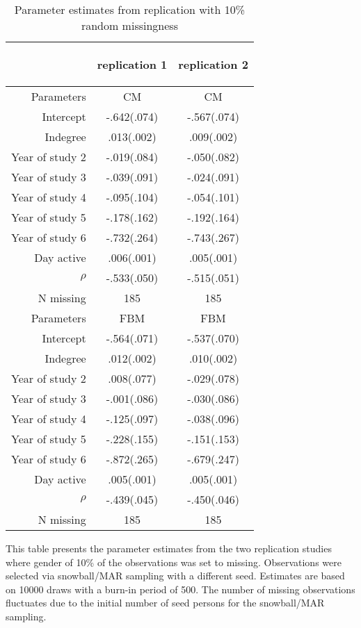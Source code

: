 \documentclass{article}
\begin{document}
\begin{table}[ht]
	\centering
	\caption{Parameter estimates from replication with 10\% random missingness}
	\label{tab:replication_random}
        \bigskip
		\bigskip
		\bigskip
		\begin{tabular}{r|cc}
			&
			\begin{rotate}{60} replication 1 \end{rotate} &
			\begin{rotate}{60} replication 2 \end{rotate} \\ \hline
			Parameters	   & CM      	& CM        \\ \hline
			Intercept 	   &-.642(.074)	&-.567(.074) \\
			Indegree	   & .013(.002)	& .009(.002) \\
			Year of study 2&-.019(.084)	&-.050(.082) \\
			Year of study 3&-.039(.091)	&-.024(.091) \\
			Year of study 4&-.095(.104)	&-.054(.101) \\
			Year of study 5&-.178(.162)	&-.192(.164) \\
			Year of study 6&-.732(.264)	&-.743(.267) \\
			Day active 	   & .006(.001)	& .005(.001) \\
			$\rho$ 		   &-.533(.050)	&-.515(.051) \\
			N missing      & 185        & 185        \\ \hline
			
			Parameters	   & FBM     	& FBM    	 \\ \hline
			Intercept 	   &-.564(.071) &-.537(.070) \\
			Indegree       & .012(.002) & .010(.002) \\
			Year of study 2& .008(.077) &-.029(.078) \\
			Year of study 3&-.001(.086) &-.030(.086) \\
			Year of study 4&-.125(.097) &-.038(.096) \\
			Year of study 5&-.228(.155) &-.151(.153) \\
			Year of study 6&-.872(.265) &-.679(.247) \\		
			Day active 	   & .005(.001) & .005(.001) \\
			$\rho$ 		   &-.439(.045) &-.450(.046) \\
			N missing      & 185        & 185        \\ \hline
		\end{tabular}
	
	\raggedright This table presents the parameter estimates from the two replication studies where gender of 10\% of the observations was set to missing. Observations were selected via snowball/MAR sampling with a different seed. Estimates are based on 10000 draws with a burn-in period of 500. The number of missing observations fluctuates due to the initial number of seed persons for the snowball/MAR sampling.
\end{table}
\end{document}
